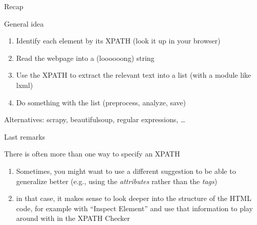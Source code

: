 \documentclass{beamer}
\begin{document}
\begin{frame}{Recap}
\begin{block}{General idea}
\begin{enumerate}
\item Identify each element by its XPATH (look it up in your browser) 
\item Read the webpage into a (loooooong) string
\item Use the XPATH to extract the relevant text into a list (with a module like lxml)
\item Do something with the list (preprocess, analyze, save)
\end{enumerate}
\footnotesize{Alternatives: scrapy, beautifulsoup, regular expressions, \ldots}
\end{block}
\end{frame}




\begin{frame}{Last remarks}
	\begin{block}{There is often more than one way to specify an XPATH}
		\begin{enumerate}
			\item Sometimes, you might want to use a different suggestion to be able to generalize better (e.g., using the \emph{attributes} rather than the \emph{tags})
			\item in that case, it makes sense to look deeper into the structure of the HTML code, for example with ``Inspect Element'' and use that information to play around with in the XPATH Checker
		\end{enumerate}
	\end{block}
\end{frame}


{
	\begin{frame}[plain]
	\end{frame}
}
\end{document}
